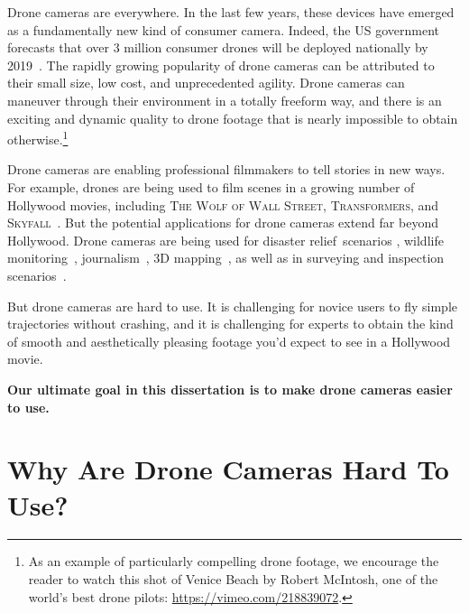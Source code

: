 
Drone cameras are everywhere.
In the last few years, these devices have emerged as a fundamentally new kind of consumer camera.
Indeed, the US government forecasts that over 3 million consumer drones will be deployed nationally by 2019~\cite{faa:2017}.
The rapidly growing popularity of drone cameras can be attributed to their small size, low cost, and unprecedented agility.
Drone cameras can maneuver through their environment in a totally freeform way, and there is an exciting and dynamic quality to drone footage that is nearly impossible to obtain otherwise.\footnote{As an example of particularly compelling drone footage, we encourage the reader to watch this shot of Venice Beach by Robert McIntosh, one of the world's best drone pilots: \url{https://vimeo.com/218839072}.}

Drone cameras are enabling professional filmmakers to tell stories in new ways. 
For example, drones are being used to film scenes in a growing number of Hollywood movies, including \textsc{The Wolf of Wall Street}, \textsc{Transformers}, and \textsc{Skyfall}~\cite{nyt:2014,wsj:2015}.
But the potential applications for drone cameras extend far beyond Hollywood.
Drone cameras are being used for disaster relief~scenarios \cite{michael:2012}, wildlife monitoring~\cite{duke:2017}, journalism~\cite{indivisible:2017}, 3D mapping~\cite{pix4d:2015}, as well as in surveying and inspection scenarios~\cite{3dr:2017a}.

But drone cameras are hard to use.
It is challenging for novice users to fly simple trajectories without crashing, and it is challenging for experts to obtain the kind of smooth and aesthetically pleasing footage you'd expect to see in a Hollywood movie.

\begin{tcolorbox}[before skip=20pt, after skip=20pt, sharp corners]
\begin{center}
\textbf{Our ultimate goal in this dissertation is to make drone cameras easier to use.}
\end{center}
\end{tcolorbox}

\section{Why Are Drone Cameras Hard To Use?}


